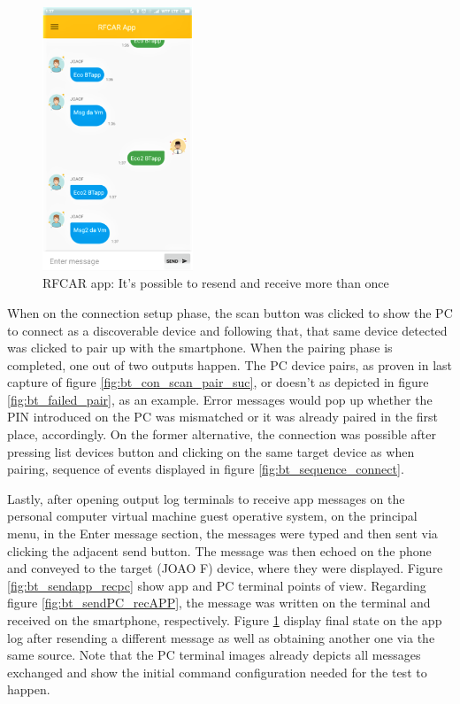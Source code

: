 %
\begin{figure}[!hbt]
\centering
\includegraphics[width=0.4\textwidth]{img/bt_resending_rereceiving.png}
\caption{\label{fig:bt_resending_rereceiving}RFCAR app: It's possible to resend and receive more than once}
\end{figure}
%
When on the connection setup phase, the scan button was clicked to show the PC to connect as a discoverable device and following that, that same device detected was clicked to pair up with the smartphone. When the pairing phase is completed, one out of two outputs happen. The PC device pairs, as proven in last capture of figure \ref{fig:bt_con_scan_pair_suc}, or doesn't as depicted in figure \ref{fig:bt_failed_pair}, as an example. Error messages would pop up whether the PIN introduced on the PC was mismatched or it was already paired in the first place, accordingly. On the former alternative, the connection was possible after pressing list devices button and clicking on the same target device as when pairing, sequence of events displayed in figure \ref{fig:bt_sequence_connect}.

Lastly, after opening output log terminals to receive app messages on the personal computer virtual machine guest operative system, on the principal menu, in the Enter message section, the messages were typed and then sent via clicking the adjacent send button. The message was then echoed on the phone and conveyed to the target (JOAO F) device, where they were displayed. Figure \ref{fig:bt_sendapp_recpc} show app and PC terminal points of view. Regarding figure \ref{fig:bt_sendPC_recAPP}, the message was written on the terminal and received on the smartphone, respectively. Figure \ref{fig:bt_resending_rereceiving} display final state on the app log after resending a different message as well as obtaining another one via the same source. Note that the PC terminal images already depicts all messages exchanged and show the initial command configuration needed for the test to happen.

